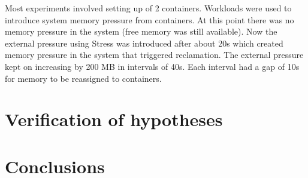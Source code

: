     Most experiments involved setting up of 2 containers. Workloads were used to introduce system memory pressure from containers. At 
this point there was no memory pressure in the system (free memory was still available). Now the external pressure using Stress was 
introduced after about 20s which created memory pressure in the system that triggered reclamation. The external pressure kept on increasing 
by 200 MB in intervals of 40s. Each interval had a gap of 10s for memory to be reassigned to containers.
  

  \section{Verification of hypotheses}
    
    
	
  
  \section{Conclusions}
    
    